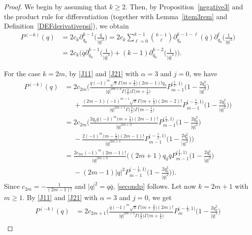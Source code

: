 \documentclass[reqno,11pt]{amsart}
\theoremstyle{definition}
\begin{document}
\begin{proof}
	We begin by assuming that $ k \geq 2 $. Then, by Proposition~\ref{negative3} and the product rule for differentiation (together with Lemma~\ref{item3rem} and Definition~\ref{DEFderivativepsi}), we obtain
	\begin{align}
		P^{(-k)}(q)& = 2c_k \partial_{q_0}^{k-1} \bigg(\frac{\bar{q}}{|q|^{3}}\bigg) = 2c_k \sum_{\ell=0}^{k-1} {k-1 \choose \ell}\partial_{q_0}^{k-1-\ell}(\overline{q}) \partial_{q_0}^{\ell} \bigg(\frac{1}{|q|^{3}}\bigg) \nonumber \\
		&=2c_k \bigg( \overline{q}  \partial_{q_0}^{k-1} \bigg(\frac{1}{|q|^{3}}\bigg) + (k-1)\partial_{q_0}^{k-2} \bigg(\frac{1}{|q|^{3}}\bigg) \bigg).		\label{EQformulaP-k}
	\end{align}
	
	For the case $k=2m$, by \eqref{J11} and \eqref{J21} with $\alpha=3$ and $j=0$, we have
				\begingroup\allowdisplaybreaks
	\begin{align*}
		P^{(-k)}(q)&=2 c_{2m}\bigg( \frac{\bar{q}(-1)^m \sqrt{\pi} \Gamma\big(m+\frac{3}{2}\big)(2m-1)!q_0}{|q|^{2m+3}
\Gamma\big(\frac{3}{2}\big)\Gamma\big(m+\frac{1}{2}\big)} P_{m-1}^{\big(\frac{1}{2},1\big)}\bigg(1-\frac{2q_0^2}{|q|^2}\bigg) \\
		&\phantom{=}+\frac{(2m-1)(-1)^{m-1}\sqrt{\pi}
\Gamma\big(m+\frac{1}{2}\big)(2m-2)!}{|q|^{2m+1}\Gamma\big(\frac{3}{2}\big)\Gamma\big(m-\frac{1}{2}\big)}P_{m-1}^{\big(-\frac{1}{2},1\big)}\bigg(1-\frac{2q_0^2}{|q|^2}\bigg) \bigg)\\
		&=2 c_{2m}\bigg( \frac{2q_0\bar{q}(-1)^m \big(m+\frac{1}{2}\big)(2m-1)!}{|q|^{2m+3}}P_{m-1}^{\big(\frac{1}{2},1\big)}\bigg(1-\frac{2q_0^2}{|q|^2}\bigg) \\
		&\phantom{=}-\frac{2(-1)^m \big(m-\frac{1}{2}\big)(2m-1)!}{|q|^{2m+1}}P_{m-1}^{\big(-\frac{1}{2},1\big)}\bigg(1-\frac{2q_0^2}{|q|^2}\bigg) \bigg)\\
		&=\frac{2c_{2m}(-1)^m(2m-1)!}{|q|^{2m+3}} \bigg( (2m+1)q_0\bar{q} P_{m-1}^{\big(\frac{1}{2},1\big)}\bigg(1-\frac{2q_0^2}{|q|^2}\bigg)\\
		&\phantom{=}-(2m-1)|q|^2 P_{m-1}^{\big(-\frac{1}{2},1\big)}\bigg(1-\frac{2q_0^2}{|q|^2}\bigg)\bigg).
	\end{align*}
	\endgroup
Since $c_{2m}=-\frac{1}{(2m-1)!}$ and $|q|^2=q\bar{q}$, \eqref{secondp} follows. Let now $k=2m+1$ with $m\geq 1$. By \eqref{J11} and \eqref{J21} with $\alpha=3$ and $j=0$, we get
	\begin{align*}
		P^{(-k)}(q)
&= 2 c_{2m+1}\bigg(\frac{\bar{q}(-1)^m\sqrt{\pi} \Gamma\big(m+\frac{3}{2}\big) (2m)!}{|q|^{2m+3}\Gamma\big(\frac{3}{2}\big)\Gamma\big(m+\frac{1}{2}\big)}P_{m}^{\big(-\frac{1}{2},1\big)}\bigg(1-\frac{2q_0^2}{|q|^2}\bigg) \\

\end{align*}
\end{proof}
\end{document}
